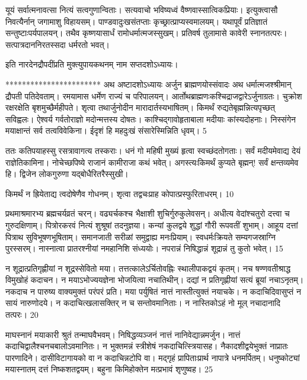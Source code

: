 यूयं सर्वात्मनावत्सा नित्यं सत्वगुणान्विताः।
सत्यवाचो भविष्यध्वं वैष्णवास्सात्विकप्रियाः।
इत्युक्त्वासौ निवत्यैर्नान् जगामाशु विहायसम्।
पाण्डवादुःखसंतप्ताः कृच्छ्रात्प्राप्यस्वमालयम्।
यथापूर्वं प्रतिज्ञातं सन्तुष्टाःपर्यपालयन्।
तथैव कृष्णयासार्धं रामोधर्मात्मजस्सुखम्।
प्रतिवर्ष तुलामासे कावेरी स्नानतत्परः।
सत्पात्रदाननिरतस्सदा धर्मरतो भवत्।

इति नारदेनद्रौपदींप्रति मुक्त्युपायकथनम् नाम
सप्तदशोऽध्यायः।

***********************
अथ अष्टादशोऽध्यायः
अर्जुन ब्राह्मणयोस्संवादः अथ धर्मात्मजश्श्रीमान् द्रौपती पतिदेवताम्।
रमयामास धर्मेण राज्यं च परिपालयन्।
आर्तोथब्राह्मणःकश्चिद्राजद्वारेऽर्जुनाग्रतः।
चुक्रोश रक्षरक्षेति बृशमुच्छैर्महीपते।
शृत्वा तथार्जुनोदीन मारादार्तस्यभाषितम्।
किमर्थं रुद्यतेबृह्मन्नित्यपृच्छत् सविह्वलः।
ऐश्वर्य गर्वतोराज्ञो मदोन्मत्तस्य दोषतः।
काश्चिद्गावोहृताबाला मदीयाः कांस्यदोहनाः।
निस्संगेन मयाक्षान्तं सर्व तत्वविवेकिना।
ईदृशं हि महदुःखं संसारेस्मिन्निति धृवम्।
5

ततः कतिपयाहस्सु रसत्रावागत्य तस्कराः।
धनं गो महिषी मुख्यं हृत्वा स्वच्छंदतोगताः।
सर्वं मदीयमेवाद्य देयं राज्ञेतिकामिना।
नोचेच्छपिष्ये राजानं कामीराजा कथं भवेत्।
अगस्त्यःकिमर्थं कुप्यते बृह्मन्! सर्वं क्षन्तव्यमेव हि।
द्विजेन लोकगुरुणा यद्बोधैरितरैस्सुखी।

किमर्थं न ह्रियेताद्य त्वदोषेणैव गोधनम्।
शृत्वा तद्वचःप्राह कोपात्प्रस्फुरिताधरम्।
10

प्रथमाश्रमारभ्य ब्रह्मचर्यव्रतं चरन्।
वढ्यर्चकश्च भैक्षाशी शुचिर्गुरुकुलेवसन्।
अधीत्य वेदांश्चतुरो दत्त्वा च गुरुदक्षिणाम्।
पित्रोरकरवं नित्यं शुश्रूषां तदनुज्ञया।
कन्यां कुलद्वये शुद्धां गौरी रूपवतीं शुभाम्।
आहूय दत्तां पित्राथ सुविभूषणभूषिताम्।
समानजाती सरीळां समुद्वाह्य मनःप्रियाम्।
स्वधर्मःक्रियते सम्यगजस्राग्नि पुरस्सरम्।
नास्नात्वा प्रातरश्नीयां नमहानिशि संध्ययोः।
नपरान्नं निषिद्धान्नं शूद्रान्नं तु कुतो भवेत्।
15

न शूद्रात्प्रतिगृह्णीयां न शूद्रस्सेवितो मया।
तत्तत्कालेऽर्चितोवह्निः स्थालीपाकद्वयं कृतम्।
नच षण्णवतीश्राद्ध विमुखोहं कदाचन।
न मयाऽभोज्ययज्ञेना भोजयित्वा नचातिथीन्।
दद्यां न प्रतिगृह्णीयां सत्यं ब्रूयां नचाऽनृतम्।
नकदाच न पारुष्य वाक्यमुक्तं परंपरं प्रति।
मया पर्युषितं नात्तं नास्तीत्युक्तं नयाचके।
न कदाचिदिवासुप्तं न सायं नारुणोदये।
न कदाचित्खलासक्तिर् न च सन्तोवमानिताः।
न नास्तिकोऽहं नो मूल् नचादानादि तत्परः।
20


माघस्नानं मयाकारी श्रुतं तन्माघवैभवम्।
निषिद्धव्यञ्जनं नात्तं नानिवेद्यान्नमर्जुन।
नात्तं कदाचिद्वालैश्चनचबालोऽवमानितः।
न भुक्तमन्नं स्त्रीशेषं नकदाचित्स्त्रियासह।
नैकादशीद्वयेभुक्तं नाप्रातः पारणादिने।
दासीविटागायको वा न कदाचिन्नटोपि वा।
मद्गृहं प्रापिताःप्रार्थ नापात्रे धनमर्पितम्।
धनुष्कोट्यां मयास्नातम् दत्तं निष्कशतद्वयम्।
बहुना किमिहोक्तेन मत्प्रभावं शृणुष्वह।
25


